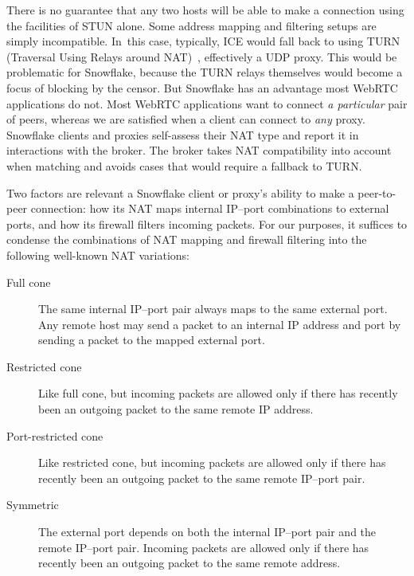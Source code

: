 \documentclass[letterpaper,twocolumn]{article}
\begin{document}
There is no guarantee that any two hosts will be able to make
a connection using the facilities of STUN alone.
Some address mapping and
filtering setups are simply incompatible.
In~this case, typically, ICE would fall back to using
TURN (Traversal Using Relays around NAT)~\cite{rfc8656},
effectively a UDP proxy.
This would be problematic for Snowflake,
because the TURN relays themselves
would become a focus of blocking by the censor.
But Snowflake has an advantage most WebRTC applications do not.
Most WebRTC applications want to connect \emph{a particular} pair of peers,
whereas we are satisfied when a client can connect to \emph{any} proxy.
Snowflake clients and proxies self-assess their NAT type
and report it in interactions with the broker.
The broker takes NAT compatibility into account when matching
and avoids cases that would require a fallback to TURN.


Two factors are relevant
a Snowflake client or proxy's
ability to make a peer-to-peer connection:
how its NAT maps internal IP--port combinations to external ports,
and how its firewall filters incoming packets.
For our purposes, it suffices
to condense the combinations of NAT mapping and firewall filtering
into the following well-known NAT variations:

\begin{description}
\item[Full cone]
The same internal IP--port pair always maps to the same external port.
Any remote host may send a packet to an internal IP address and port by sending a packet to the
mapped external port.
\item[Restricted cone]
Like full cone,
but incoming packets
are allowed only if
there has recently been an outgoing packet
to the same remote IP address.
\item[Port-restricted cone]
Like restricted cone,
but incoming packets are allowed only if
there has recently been an outgoing packet
to the same remote IP--port pair.
\item[Symmetric]
The external port depends on both
the internal IP--port pair and the remote IP--port pair.
Incoming packets are allowed only if
there has recently been an outgoing
packet to the same remote address.
\end{description}
\end{document}
